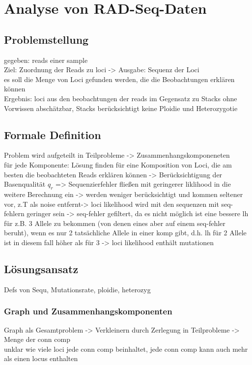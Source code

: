 \chapter{Analyse von RAD-Seq-Daten} \label{chapter:kap2}
\section{Problemstellung} \label{sec:probl}
gegeben: reads einer sample \\
Ziel: Zuordnung der Reads zu loci -> Ausgabe: Sequenz der Loci \\
es soll die Menge von Loci gefunden werden, die die Beobachtungen erklären können \\
Ergebnis: loci aus den beobachtungen der reads
im Gegensatz zu Stacks ohne Vorwissen abschätzbar, Stacks berücksichtigt keine Ploidie und Heterozygotie \\


\section{Formale Definition} \label{sec:formal}
Problem wird aufgeteilt in Teilprobleme -> Zusammenhangskomponeneten \\
für jede Komponente: Lösung finden für eine Komposition von Loci, die am besten die beobachteten Reads erklären können
-> Berücksichtigung der Basenqualität $q_{r}$ => Sequenzierfehler fließen mit geringerer liklihood in die weitere Berechnung ein -> werden weniger berücksichtigt und kommen seltener vor, z.T als noise entfernt-> loci likelihood wird mit den sequenzen mit seq-fehlern geringer sein -> seq-fehler gefiltert, da es nicht möglich ist eine  bessere lh für z.B. 3 Allele zu bekommen (von denen eines aber auf einem seq-fehler beruht), wenn es nur 2 tatsächliche Allele in einer komp gibt, d.h. lh für 2 Allele ist in diesem fall höher als für 3 -> loci likelihood enthält mutationen \\

\section{Lösungsansatz} \label{sec:solution}
Defs von Sequ, Mutationsrate, ploidie, heterozyg
\subsection{Graph und Zusammenhangskomponenten} \label{subsec:sol_graph}
Graph als Gesamtproblem -> Verkleinern durch Zerlegung in Teilprobleme -> Menge der conn comp\\
unklar wie viele loci jede conn comp beinhaltet, jede conn comp kann auch mehr als einen locus enthalten\\
